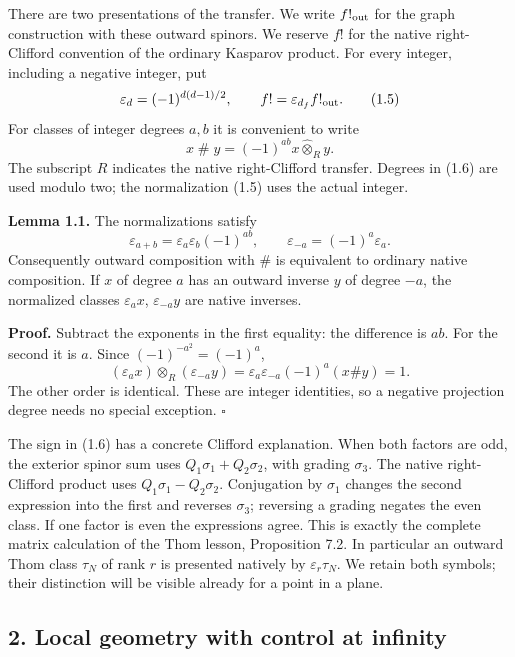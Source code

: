 \documentclass[
  11pt,
]{article}
\begin{document}
There are two presentations of the transfer. We write \(f!_{\rm out}\)
for the graph construction with these outward spinors. We reserve \(f!\)
for the native right-Clifford convention of the ordinary Kasparov
product. For every integer, including a negative integer, put \[
 \varepsilon_d=(-1)^{d(d-1)/2},\qquad
 f!=\varepsilon_{d_f}f!_{\rm out}.
 \tag{1.5}
\] For classes of integer degrees \(a,b\) it is convenient to write \[
 x\mathbin{\#}y=(-1)^{ab}x\widehat\otimes_R y.
 \tag{1.6}
\] The subscript \(R\) indicates the native right-Clifford transfer.
Degrees in (1.6) are used modulo two; the normalization (1.5) uses the
actual integer.

\textbf{Lemma 1.1.} The normalizations satisfy \[
 \varepsilon_{a+b}=\varepsilon_a\varepsilon_b(-1)^{ab},\qquad
 \varepsilon_{-a}=(-1)^a\varepsilon_a.
 \tag{1.7}
\] Consequently outward composition with \(\#\) is equivalent to
ordinary native composition. If \(x\) of degree \(a\) has an outward
inverse \(y\) of degree \(-a\), the normalized classes
\(\varepsilon_ax\), \(\varepsilon_{-a}y\) are native inverses.

\textbf{Proof.} Subtract the exponents in the first equality: the
difference is \(ab\). For the second it is \(a\). Since
\((-1)^{-a^2}=(-1)^a\), \[
 (\varepsilon_ax)\otimes_R(\varepsilon_{-a}y)
 =\varepsilon_a\varepsilon_{-a}(-1)^a(x\#y)=1.
\] The other order is identical. These are integer identities, so a
negative projection degree needs no special exception. \(\square\)

The sign in (1.6) has a concrete Clifford explanation. When both factors
are odd, the exterior spinor sum uses \(Q_1\sigma_1+Q_2\sigma_2\), with
grading \(\sigma_3\). The native right-Clifford product uses
\(Q_1\sigma_1-Q_2\sigma_2\). Conjugation by \(\sigma_1\) changes the
second expression into the first and reverses \(\sigma_3\); reversing a
grading negates the even class. If one factor is even the expressions
agree. This is exactly the complete matrix calculation of the Thom
lesson, Proposition 7.2. In particular an outward Thom class \(\tau_N\)
of rank \(r\) is presented natively by \(\varepsilon_r\tau_N\). We
retain both symbols; their distinction will be visible already for a
point in a plane.

\subsection{2. Local geometry with control at
infinity}\label{local-geometry-with-control-at-infinity}
\end{document}

